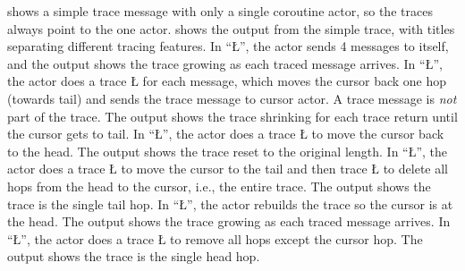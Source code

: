 \documentclass[openright,twoside]{report}
\begin{document}
 shows a simple trace message with only a single coroutine actor, so the traces always point to the one actor.
 shows the output from the simple trace, with titles separating different tracing features.
In ``\LGinlinetrue\LGbegin\lgrinde\L{}\endlgrinde\LGend{}'', the actor sends 4 messages to itself, and the output shows the trace growing as each traced message arrives.
In ``\LGinlinetrue\LGbegin\lgrinde\L{}\endlgrinde\LGend{}'', the actor does a trace \LGinlinetrue\LGbegin\lgrinde\L{}\endlgrinde\LGend{} for each message, which moves the cursor back one hop (towards tail) and sends the trace message to cursor actor.
A trace message is \emph{not} part of the trace.
The output shows the trace shrinking for each trace return until the cursor gets to tail.
In ``\LGinlinetrue\LGbegin\lgrinde\L{}\endlgrinde\LGend{}'', the actor does a trace \LGinlinetrue\LGbegin\lgrinde\L{}\endlgrinde\LGend{} to move the cursor back to the head.
The output shows the trace reset to the original length.
In ``\LGinlinetrue\LGbegin\lgrinde\L{}\endlgrinde\LGend{}'', the actor does a trace \LGinlinetrue\LGbegin\lgrinde\L{}\endlgrinde\LGend{} to move the cursor to the tail and then trace \LGinlinetrue\LGbegin\lgrinde\L{}\endlgrinde\LGend{} to delete all hops from the head to the cursor, i.e., the entire trace.
The output shows the trace is the single tail hop.
In ``\LGinlinetrue\LGbegin\lgrinde\L{}\endlgrinde\LGend{}'', the actor rebuilds the trace so the cursor is at the head.
The output shows the trace growing as each traced message arrives.
In ``\LGinlinetrue\LGbegin\lgrinde\L{}\endlgrinde\LGend{}'', the actor does a trace \LGinlinetrue\LGbegin\lgrinde\L{}\endlgrinde\LGend{} to remove all hops except the cursor hop.
The output shows the trace is the single head hop.
\end{document}
